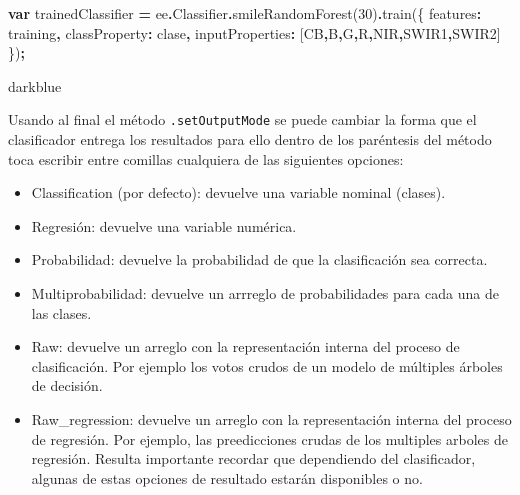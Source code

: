 \documentclass[
  12pt,
  letterpaper,
  twoside]{book}
\newenvironment{Shaded}{\begin{snugshade}}{\end{snugshade}}
\newcommand{\AttributeTok}[1]{\textcolor[rgb]{0.77,0.63,0.00}{#1}}
\newcommand{\DataTypeTok}[1]{\textcolor[rgb]{0.13,0.29,0.53}{#1}}
\newcommand{\DecValTok}[1]{\textcolor[rgb]{0.00,0.00,0.81}{#1}}
\newcommand{\FunctionTok}[1]{\textcolor[rgb]{0.00,0.00,0.00}{#1}}
\newcommand{\KeywordTok}[1]{\textcolor[rgb]{0.13,0.29,0.53}{\textbf{#1}}}
\newcommand{\NormalTok}[1]{#1}
\newcommand{\OperatorTok}[1]{\textcolor[rgb]{0.81,0.36,0.00}{\textbf{#1}}}
\newcommand{\StringTok}[1]{\textcolor[rgb]{0.31,0.60,0.02}{#1}}
\providecommand{\tightlist}{%
  \setlength{\itemsep}{0pt}\setlength{\parskip}{0pt}}
\begin{document}
\begin{Shaded}
\begin{Highlighting}[]
\KeywordTok{var}\NormalTok{ trainedClassifier }\OperatorTok{=}\NormalTok{ ee}\OperatorTok{.}\AttributeTok{Classifier}\OperatorTok{.}\FunctionTok{smileRandomForest}\NormalTok{(}\DecValTok{30}\NormalTok{)}\OperatorTok{.}\FunctionTok{train}\NormalTok{(\{}
  \DataTypeTok{features}\OperatorTok{:}\NormalTok{ training}\OperatorTok{,}
  \DataTypeTok{classProperty}\OperatorTok{:} \StringTok{\textquotesingle{}clase\textquotesingle{}}\OperatorTok{,}
  \DataTypeTok{inputProperties}\OperatorTok{:}\NormalTok{ [}\StringTok{\textquotesingle{}CB\textquotesingle{}}\OperatorTok{,}\StringTok{\textquotesingle{}B\textquotesingle{}}\OperatorTok{,}\StringTok{\textquotesingle{}G\textquotesingle{}}\OperatorTok{,}\StringTok{\textquotesingle{}R\textquotesingle{}}\OperatorTok{,}\StringTok{\textquotesingle{}NIR\textquotesingle{}}\OperatorTok{,}\StringTok{\textquotesingle{}SWIR1\textquotesingle{}}\OperatorTok{,}\StringTok{\textquotesingle{}SWIR2\textquotesingle{}}\NormalTok{]}
\NormalTok{\})}\OperatorTok{;}
\end{Highlighting}
\end{Shaded}

\begin{bluebox2}

\begin{awesomeblock}{5pt}{\faLightbulb}{darkblue}

Usando al final el método \texttt{.setOutputMode} se puede cambiar la forma que el clasificador entrega los resultados para ello dentro de los paréntesis del método toca escribir entre comillas cualquiera de las siguientes opciones:

\begin{itemize}
\tightlist
\item
  Classification (por defecto): devuelve una variable nominal (clases).
\item
  Regresión: devuelve una variable numérica.
\item
  Probabilidad: devuelve la probabilidad de que la clasificación sea correcta.
\item
  Multiprobabilidad: devuelve un arrreglo de probabilidades para cada una de las clases.
\item
  Raw: devuelve un arreglo con la representación interna del proceso de clasificación. Por ejemplo los votos crudos de un modelo de múltiples árboles de decisión.
\item
  Raw\_regression: devuelve un arreglo con la representación interna del proceso de regresión. Por ejemplo, las preedicciones crudas de los multiples arboles de regresión.
  Resulta importante recordar que dependiendo del clasificador, algunas de estas opciones de resultado estarán disponibles o no.
\end{itemize}

\end{awesomeblock}

\end{bluebox2}
\end{document}
